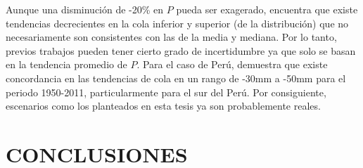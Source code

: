 \documentclass[12pt]{article}
\begin{document}
Aunque una disminución de -20\% en $P$ pueda ser exagerado, \citet{lausier2018overlooked} encuentra que existe tendencias decrecientes en la cola inferior y superior (de la distribución) que no necesariamente son consistentes con las de la media y mediana. Por lo tanto, previos trabajos pueden tener cierto grado de incertidumbre ya que solo se basan en la tendencia promedio de $P$. Para el caso de Perú, \citet{lausier2018overlooked} demuestra que existe concordancia en las tendencias de cola en un rango de -30mm a -50mm para el periodo 1950-2011, particularmente para el sur del Perú. Por consiguiente, escenarios como los planteados en esta tesis ya son probablemente reales.



\clearpage
\vspace*{0.5mm}
\section{CONCLUSIONES}
\end{document}
